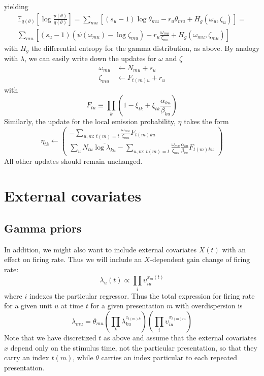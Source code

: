 \documentclass[11pt]{article}
\begin{document}
yielding
\begin{multline}
    \mathbb{E}_{q(\theta)} \left[ \log \frac{p(\theta)}{q(\theta)} \right] =
    \sum_{mu} \left[ (s_u - 1) \overline{\log \theta_{mu}} - r_u \overline{\theta_{mu}} + H_g(\omega_u, \zeta_u) \right] =\\
    \sum_{mu} \left[ (s_u - 1) (\psi(\omega_{mu}) - \log \zeta_{mu}) - r_u \frac{\omega_{mu}}{\zeta_{mu}} + H_g(\omega_{mu}, \zeta_{mu}) \right]
\end{multline}
with $H_g$ the differential entropy for the gamma distribution, as above. By analogy with $\lambda$, we can easily write down the updates for $\omega$ and $\zeta$
\begin{align}
    \omega_{mu} &\leftarrow N_{mu} + s_u \\
    \zeta_{mu} &\leftarrow F_{t(m)u} + r_u
\end{align}
with
\begin{equation}
    F_{tu} \equiv \prod_k \left( 1 - \xi_{tk} + \xi_{tk} \frac{\alpha_{ku}}{\beta_{ku}}\right)
\end{equation}
Similarly, the update for the local emission probability, $\eta$ takes the form
\begin{equation}
    \eta_{tk} \leftarrow
    \begin{pmatrix}
        -\sum_{u, m: \, t(m) = t} \frac{\omega_{mu}}{\zeta_{mu}} F_{t(m)ku} \\
        \sum_u N_{tu} \overline{\log \lambda_{ku}} -
        \sum_{u, m: \, t(m) = t} \frac{\omega_{mu}} {\zeta_{mu}}\frac{\alpha_{ku}}{\beta_{ku}} F_{t(m)ku}
    \end{pmatrix}
\end{equation}
All other updates should remain unchanged.

\section{External covariates}
\subsection{Gamma priors}
In addition, we might also want to include external covariates $X(t)$ with an effect on firing rate. Thus we will include an $X$-dependent gain change of firing rate:
\begin{equation}
    \lambda_{u}(t) \propto \prod_i \upsilon_{iu}^{x_{iu}(t)}
\end{equation}
where $i$ indexes the particular regressor. Thus the total expression for firing rate for a given unit $u$ at time $t$ for a given presentation $m$ with overdispersion is
\begin{equation}
    \lambda_{mu} = \theta_{mu}\left(\prod_k \lambda_{ku}^{z_{t(m)k}} \right) \left(\prod_i \upsilon_{iu}^{x_{t(m)iu}} \right)
\end{equation}
Note that we have discretized $t$ as above and assume that the external covariates $x$ depend only on the stimulus time, not the particular presentation, so that they carry an index $t(m)$, while $\theta$ carries an index particular to each repeated presentation.
\end{document}
